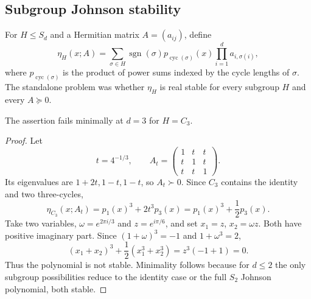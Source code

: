 \subsection{Subgroup Johnson stability}

For $H\le S_d$ and a Hermitian matrix $A=(a_{ij})$, define
\[
\eta_H(x;A)=\sum_{\sigma\in H}\operatorname{sgn}(\sigma)
 p_{\operatorname{cyc}(\sigma)}(x)\prod_{i=1}^d a_{i,\sigma(i)},
\]
where $p_{\operatorname{cyc}(\sigma)}$ is the product of power sums indexed by the cycle lengths of $\sigma$.  The standalone problem was whether $\eta_H$ is real stable for every subgroup $H$ and every $A\succeq0$.

\begin{theorem}\label{thm:subgroup}
The assertion fails minimally at $d=3$ for $H=C_3$.
\end{theorem}
\begin{proof}
Let
\[
t=4^{-1/3},\qquad
A_t=\begin{pmatrix}1&t&t\\t&1&t\\t&t&1\end{pmatrix}.
\]
Its eigenvalues are $1+2t,1-t,1-t$, so $A_t\succ0$.  Since $C_3$ contains the identity and two three-cycles,
\[
\eta_{C_3}(x;A_t)=p_1(x)^3+2t^3p_3(x)=p_1(x)^3+\frac12p_3(x).
\]
Take two variables, $\omega=e^{2\pi i/3}$ and $z=e^{i\pi/6}$, and set $x_1=z$, $x_2=\omega z$.  Both have positive imaginary part.  Since $(1+\omega)^3=-1$ and $1+\omega^3=2$,
\[
(x_1+x_2)^3+\frac12(x_1^3+x_2^3)=z^3(-1+1)=0.
\]
Thus the polynomial is not stable.  Minimality follows because for $d\le2$ the only subgroup possibilities reduce to the identity case or the full $S_2$ Johnson polynomial, both stable.
\end{proof}
